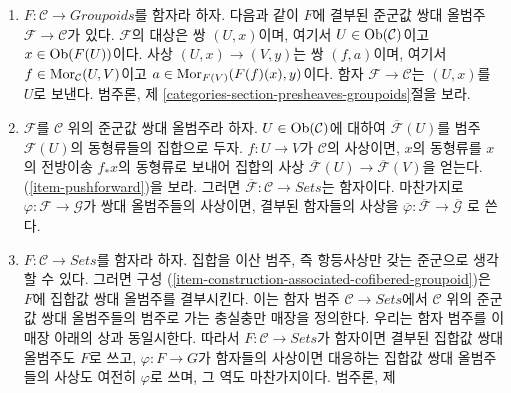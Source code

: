 \begin{remarks}
\begin{enumerate}
$p : \mathcal{F} \to C$와 $p': \mathcal{F}' \to \mathcal{C}$가
준군값 쌍대 올범주이고
$\varphi, \psi : \mathcal{F} \to \mathcal{F}'$가 $1$-사상이면,
2-사상 $t : \varphi \to \psi$란 모든
$x \in \Ob(\mathcal{F})$에 대하여
$p'(t_x) = \text{id}_{p(x)}$를 만족하는 함자들의 사상을 말한다.
\item
\label{item-construction-associated-cofibered-groupoid}
$F : \mathcal{C} \to \textit{Groupoids}$를 함자라 하자.
다음과 같이 $F$에 결부된 준군값 쌍대 올범주
$\mathcal{F} \to \mathcal{C}$가 있다.
$\mathcal{F}$의 대상은 쌍 $(U, x)$이며, 여기서
$U \in \mathop{\mathrm{Ob}}\nolimits(\mathcal{C})$이고 $x \in \mathop{\mathrm{Ob}}\nolimits(F(U))$이다.
사상 $(U, x) \to (V, y)$는 쌍 $(f, a)$이며, 여기서
$f \in \mathop{\mathrm{Mor}}\nolimits_\mathcal{C}(U, V)$이고
$a \in \mathop{\mathrm{Mor}}\nolimits_{F(V)}(F(f)(x), y)$이다.
함자 $\mathcal{F} \to \mathcal{C}$는 $(U, x)$를 $U$로 보낸다.
범주론, 제 \ref{categories-section-presheaves-groupoids}절을 보라.
\item
\label{item-associated-functor-isomorphism-classes}
$\mathcal{F}$를 $\mathcal{C}$ 위의 준군값 쌍대 올범주라 하자.
$U \in \mathop{\mathrm{Ob}}\nolimits(\mathcal{C})$에 대하여
$\overline{\mathcal{F}}(U)$를 범주 $\mathcal{F}(U)$의
동형류들의 집합으로 두자.
$f : U \to V$가 $\mathcal{C}$의 사상이면, $x$의 동형류를
$x$의 전방이송 $f_*x$의 동형류로 보내어 집합의 사상
$\overline{\mathcal{F}}(U) \to \overline{\mathcal{F}}(V)$을 얻는다.
(\ref{item-pushforward})을 보라. 그러면
$\overline{\mathcal{F}} : \mathcal{C} \to \textit{Sets}$는 함자이다.
마찬가지로 $\varphi : \mathcal{F} \to \mathcal{G}$가 쌍대
올범주들의 사상이면, 결부된 함자들의 사상을
$\overline{\varphi}: \overline{\mathcal{F}} \to  \overline{\mathcal{G}}$
로 쓴다.
\item
\label{item-convention-cofibered-sets}
$F: \mathcal{C} \to \textit{Sets}$를 함자라 하자.
집합을 이산 범주, 즉 항등사상만 갖는 준군으로 생각할 수 있다.
그러면 구성 (\ref{item-construction-associated-cofibered-groupoid})은
$F$에 집합값 쌍대 올범주를 결부시킨다. 이는 함자 범주
$\mathcal{C} \to \textit{Sets}$에서 $\mathcal{C}$ 위의 준군값
쌍대 올범주들의 범주로 가는 충실충만 매장을 정의한다.
우리는 함자 범주를 이 매장 아래의 상과 동일시한다.
따라서 $F : \mathcal{C} \to \textit{Sets}$가 함자이면 결부된 집합값
쌍대 올범주도 $F$로 쓰고, $\varphi : F \to G$가 함자들의 사상이면
대응하는 집합값 쌍대 올범주들의 사상도 여전히 $\varphi$로 쓰며,
그 역도 마찬가지이다. 범주론, 제

\end{enumerate}
\end{remarks}
